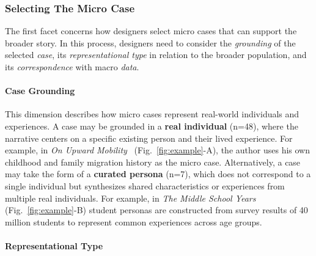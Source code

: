 
\subsubsection{Selecting The Micro Case}
The first facet concerns how designers select micro cases that can support the broader story. In this process, designers need to consider the \textit{grounding} of the selected \textit{case}, its \textit{representational type} in relation to the broader population, and its \textit{correspondence} with macro \textit{data}.

\paragraph{\textbf{\textcolor{col}{Case Grounding}}}

This dimension describes how micro cases represent real-world individuals and experiences. A case may be grounded in a \textbf{real individual} (n=48), where the narrative centers on a specific existing person and their lived experience. For example, in \textit{On Upward Mobility}~\cite{williams2022upwardmobility} (Fig.~\ref{fig:example}-A), the author uses his own childhood and family migration history as the micro case. Alternatively, a case may take the form of a \textbf{curated persona} (n=7), which does not correspond to a single individual but synthesizes shared characteristics or experiences from multiple real individuals. For example, in \textit{The Middle School Years}~\cite{chang2025middle} (Fig.~\ref{fig:example}-B) student personas are constructed from survey results of 40 million students to represent common experiences across age groups.

\paragraph{\textbf{\textcolor{col}{Representational Type}}}

